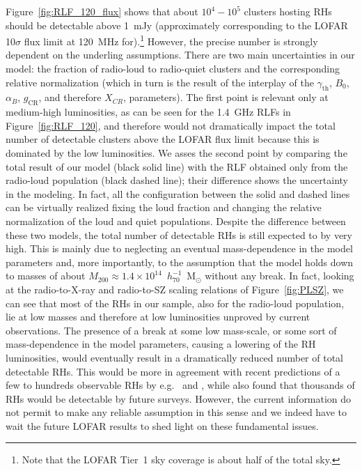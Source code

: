 \documentclass[traditabstract]{aa}
\newcommand{\rmn}{\mathrm}
\begin{document}
Figure~\ref{fig:RLF_120_flux} shows that about $10^4-10^5$ clusters hosting RHs should be detectable above 1~mJy (approximately corresponding to the LOFAR 10$\sigma$ flux limit at 120~MHz for).\footnote[16]{Note that the LOFAR Tier~1 sky coverage is about half of the total sky.} However, the precise number is strongly dependent on the underling assumptions. There are two main uncertainties in our model: the fraction of radio-loud to radio-quiet clusters and the corresponding relative normalization (which in turn is the result of the interplay of the $\gamma_{\rmn{th}}$, $B_{0}$, $\alpha_{B}$, $g_{\rmn{CR}}$, and therefore $X_{CR}$, parameters). The first point is relevant only at medium-high luminosities, as can be seen for the 1.4~GHz RLFs in Figure~\ref{fig:RLF_120}, and therefore would not dramatically impact the total number of detectable clusters above the LOFAR flux limit because this is dominated by the low luminosities. We asses the second point by comparing the total result of our model (black solid line) with the RLF obtained only from the radio-loud population (black dashed line); their difference shows the uncertainty in the modeling. In fact, all the configuration between the solid and dashed lines can be virtually realized fixing the loud fraction and changing the relative normalization of the loud and quiet populations. Despite the difference between these two models, the total number of detectable RHs is still expected to by very high. This is mainly due to neglecting an eventual mass-dependence in the model parameters and, more importantly, to the assumption that the model holds down to masses of about $M_{200}\approx1.4\times10^{14}$~$h_{70}^{-1}$~M$_{\odot}$ without any break. In fact, looking at the radio-to-X-ray and radio-to-SZ scaling relations of Figure~\ref{fig:PLSZ}, we can see that most of the RHs in our sample, also for the radio-loud population, lie at low masses and therefore at low luminosities unproved by current observations. The presence of a break at some low mass-scale, or some sort of mass-dependence in the model parameters, causing a lowering of the RH luminosities, would eventually result in a dramatically reduced number of total detectable RHs. This would be more in agreement with recent predictions of a few to hundreds observable RHs by e.g.~\cite{2010A&A...509A..68C} and \cite{2011arXiv1110.2786S}, while \cite{2002A&A...396...83E} also found that thousands of RHs would be detectable by future surveys. However, the current information do not permit to make any reliable assumption in this sense and we indeed have to wait the future LOFAR results to shed light on these fundamental issues. 
\end{document}
